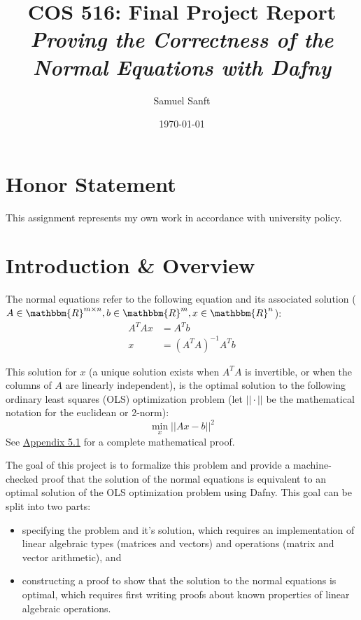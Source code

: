 \documentclass[12pt]{article}
\begin{document}
\title{COS 516: Final Project Report\\
\emph{Proving the Correctness of the Normal Equations with Dafny}} %
\author{Samuel Sanft}
\date{\today}
\maketitle

\section*{Honor Statement}
This assignment represents my own work in accordance with university policy.

\section{Introduction \& Overview}
The normal equations refer to the following equation and its associated solution ($A \in \mathbbm{R}^{m \times n}, b \in \mathbbm{R}^m, x \in \mathbbm{R}^n$):
\begin{align*}
A^T A x &= A^T b \\
x &= (A^T A)^{-1} A^T b
\end{align*}

This solution for $x$ (a unique solution exists when $A^T A$ is invertible, or when the columns of $A$ are linearly independent), is the optimal solution to the following ordinary least squares (OLS) optimization problem (let $||\cdot||$ be the mathematical notation for the euclidean or 2-norm):
$$\min_x ||Ax - b||^2$$
See \hyperref[sec:mathproof]{Appendix 5.1} for a complete mathematical proof.

The goal of this project is to formalize this problem and provide a machine-checked proof that the solution of the normal equations is equivalent to an optimal solution of the OLS optimization problem using Dafny. This goal can be split into two parts:
\begin{itemize}
\item specifying the problem and it's solution, which requires an implementation of linear algebraic types (matrices and vectors) and operations (matrix and vector arithmetic), and
\item constructing a proof to show that the solution to the normal equations is optimal, which requires first writing proofs about known properties of linear algebraic operations.
\end{itemize}
\end{document}
